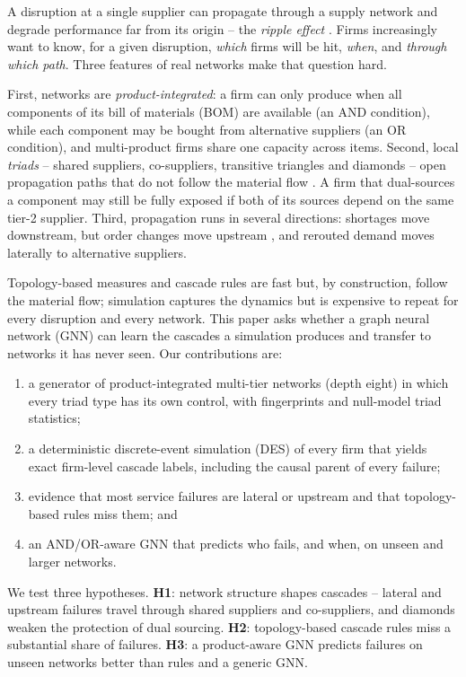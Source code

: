 \documentclass{ifacconf}
\begin{document}
A disruption at a single supplier can propagate through a supply network and degrade performance far from its origin -- the \emph{ripple effect} \citep{Ivanov2014,Dolgui2018}. Firms increasingly want to know, for a given disruption, \emph{which} firms will be hit, \emph{when}, and \emph{through which path}. Three features of real networks make that question hard.

First, networks are \emph{product-integrated}: a firm can only produce when all components of its bill of materials (BOM) are available (an AND condition), while each component may be bought from alternative suppliers (an OR condition), and multi-product firms share one capacity across items. Second, local \emph{triads} -- shared suppliers, co-suppliers, transitive triangles and diamonds -- open propagation paths that do not follow the material flow \citep{ChoiWu2009,Ang2017}. A firm that dual-sources a component may still be fully exposed if both of its sources depend on the same tier-2 supplier. Third, propagation runs in several directions: shortages move downstream, but order changes move upstream \citep{Li2021}, and rerouted demand moves laterally to alternative suppliers.

Topology-based measures and cascade rules \citep{Zhao2019,SimchiLevi2015} are fast but, by construction, follow the material flow; simulation captures the dynamics but is expensive to repeat for every disruption and every network. This paper asks whether a graph neural network (GNN) can learn the cascades a simulation produces and transfer to networks it has never seen. Our contributions are:
\begin{enumerate}
\item a generator of product-integrated multi-tier networks (depth eight) in which every triad type has its own control, with fingerprints and null-model triad statistics;
\item a deterministic discrete-event simulation (DES) of every firm that yields exact firm-level cascade labels, including the causal parent of every failure;
\item evidence that most service failures are lateral or upstream and that topology-based rules miss them; and
\item an AND/OR-aware GNN that predicts who fails, and when, on unseen and larger networks.
\end{enumerate}

We test three hypotheses. \textbf{H1}: network structure shapes cascades -- lateral and upstream failures travel through shared suppliers and co-suppliers, and diamonds weaken the protection of dual sourcing. \textbf{H2}: topology-based cascade rules miss a substantial share of failures. \textbf{H3}: a product-aware GNN predicts failures on unseen networks better than rules and a generic GNN.
\end{document}
